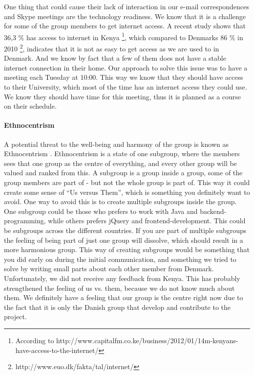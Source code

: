 One thing that could cause their lack of interaction in our e-mail correspondences and Skype meetings are the technology readiness. We know that it is a challenge for some of the group members to get internet access. A recent study shows that 36,3 \% has access to internet in Kenya \footnote{According to http://www.capitalfm.co.ke/business/2012/01/14m-kenyans-have-access-to-the-internet/}, which compared to Denmarks 86 \% in 2010 \footnote{http://www.euo.dk/fakta/tal/internet/}, indicates that it is not as easy to get access as we are used to in Denmark. And we know by fact that a few of them does not have a stable internet connection in their home. Our approach to solve this issue was to have a meeting each Tuesday at 10:00. This way we know that they should have access to their University, which most of the time has an internet access they could use. We know they should have time for this meeting, thus it is planned as a course on their schedule.

\paragraph{Ethnocentrism} \label{par:ethnocentrism}
A potential threat to the well-being and harmony of the group is known as Ethnocentrism \cite{durnell2004subgroup}. Ethnocentrism is a state of one subgroup, where the members sees that one group as the centre of everything, and every other group will be valued and ranked from this. A subgroup is a group inside a group, some of the group members are part of - but not the whole group is part of. This way it could create some sense of ``Us versus Them'', which is something you definitely want to avoid. One way to avoid this is to create multiple subgroups inside the group. One subgroup could be those who prefers to work with Java and backend-programming, while others prefers jQuery and frontend-development. This could be subgroups across the different countries. If you are part of multiple subgroups the feeling of being part of just one group will dissolve, which should result in a more harmonious group.
This way of creating subgroups would be something that you did early on during the initial communication, and something we tried to solve by writing small parts about each other member from Denmark. Unfortunately, we did not receive any feedback from Kenya. This has probably strengthened the feeling of us vs. them, because we do not know much about them. We definitely have a feeling that our group is the centre right now due to the fact that it is only the Danish group that develop and contribute to the project.

